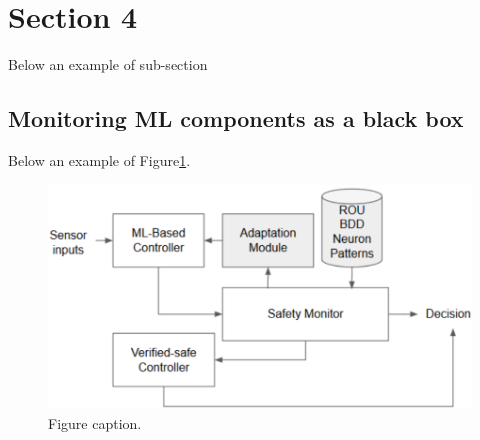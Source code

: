 \section{Section 4}
Below an example of sub-section

\subsection{Monitoring ML components as a black box} 
Below an example of Figure\ref{fig_example}.

\begin{figure}[htb]
\centering
\includegraphics[width=.52\linewidth]{img/proposal.pdf}
\caption{Figure caption.} \label{fig_example}
\end{figure}